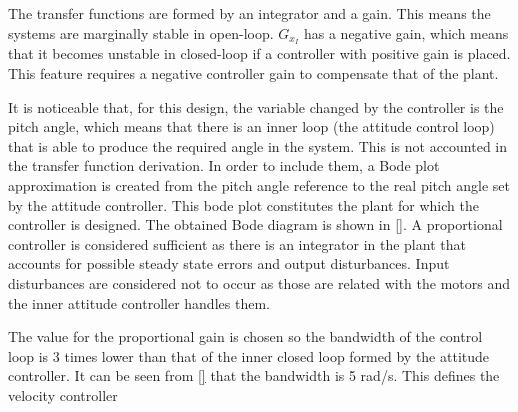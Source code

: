 The transfer functions are formed by an integrator and a gain. This means the systems are marginally stable in open-loop. $G_{x_I}$ has a negative gain, which means that it becomes unstable in closed-loop if a controller with positive gain is placed. This feature requires a negative controller gain to compensate that of the plant.

It is noticeable that, for this design, the variable changed by the controller is the pitch angle, which means that there is an inner loop (the attitude control loop) that is able to produce the required angle in the system. This is not accounted in the transfer function derivation. In order to include them, a Bode plot approximation is created from the pitch angle reference to the real pitch angle set by the attitude controller. This bode plot constitutes the plant for which the controller is designed.
%
The obtained Bode diagram is shown in \autoref{}.
%
%
%
A proportional controller is considered sufficient as there is an integrator in the plant that accounts for possible steady state errors and output disturbances. Input disturbances are considered not to occur as those are related with the motors and the inner attitude controller handles them.

The value for the proportional gain is chosen so the bandwidth of the control loop is 3 times lower than that of the inner closed loop formed by the attitude controller. It can be seen from \autoref{} that the bandwidth is 5 rad/s. This defines the velocity controller  

